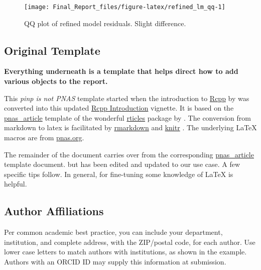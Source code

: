 \documentclass[letterpaper,10pt,twocolumn,twoside,]{pinp}
\begin{document}
\begin{figure}

{\centering \texttt{[image: Final\_Report\_files/figure-latex/refined\_lm\_qq-1]} 

}

\caption{\label{fig:refined_lm_qq}QQ plot of refined model residuals. Slight difference.}\label{fig:refined_lm_qq}
\end{figure}

\hypertarget{original-template}{%
\subsection{Original Template}\label{original-template}}

\textbf{Everything underneath is a template that helps direct how to add
various objects to the report.}

This \emph{pinp is not PNAS} template started when the introduction to
\href{http://dirk.eddelbuettel.com/code/rcpp.html}{Rcpp} by
\cite{PeerJ:Rcpp} was converted into this updated
\href{https://eddelbuettel.github.io/pinp/Rcpp-introduction.pdf}{Rcpp
Introduction} vignette. It is based on the
\href{https://github.com/rstudio/rticles/tree/master/inst/rmarkdown/templates/pnas_article}{pnas\_article}
template of the wonderful
\href{https://cran.r-project.org/package=rticles}{rticles} package by
\cite{CRAN:rticles}. The conversion from markdown to latex is
facilitated by
\href{https://cran.r-project.org/package=rmarkdown}{rmarkdown}
\citep{CRAN:rmarkdown} and
\href{https://cran.r-project.org/package=knitr}{knitr}
\citep{CRAN:knitr}. The underlying LaTeX macros are from
\href{http://www.pnas.org/site/authors/latex.xhtml}{pnas.org}.

The remainder of the document carries over from the corresponding
\href{https://github.com/rstudio/rticles/tree/master/inst/rmarkdown/templates/pnas_article}{pnas\_article}
template document. but has been edited and updated to our use case. A
few specific tips follow. In general, for fine-tuning some knowledge of
LaTeX is helpful.

\hypertarget{author-affiliations}{%
\subsection{Author Affiliations}\label{author-affiliations}}

Per common academic best practice, you can include your department,
institution, and complete address, with the ZIP/postal code, for each
author. Use lower case letters to match authors with institutions, as
shown in the example. Authors with an ORCID ID may supply this
information at submission.
\end{document}
